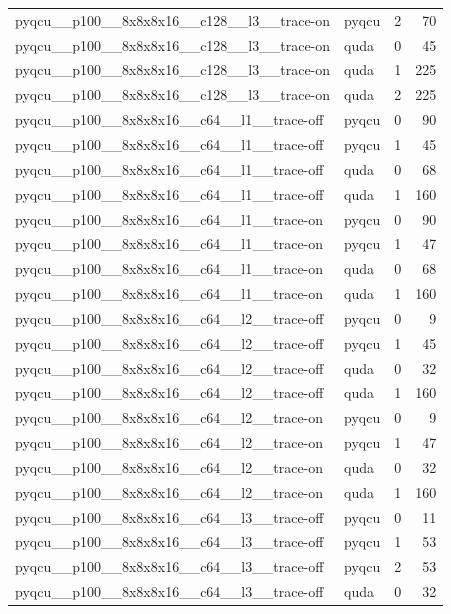 \begin{table}[htbp]
\begin{tabular}{@{}llrr@{}}
pyqcu\_\_p100\_\_8x8x8x16\_\_c128\_\_l3\_\_trace-on & pyqcu & 2 & 70 \\
pyqcu\_\_p100\_\_8x8x8x16\_\_c128\_\_l3\_\_trace-on & quda & 0 & 45 \\
pyqcu\_\_p100\_\_8x8x8x16\_\_c128\_\_l3\_\_trace-on & quda & 1 & 225 \\
pyqcu\_\_p100\_\_8x8x8x16\_\_c128\_\_l3\_\_trace-on & quda & 2 & 225 \\
pyqcu\_\_p100\_\_8x8x8x16\_\_c64\_\_l1\_\_trace-off & pyqcu & 0 & 90 \\
pyqcu\_\_p100\_\_8x8x8x16\_\_c64\_\_l1\_\_trace-off & pyqcu & 1 & 45 \\
pyqcu\_\_p100\_\_8x8x8x16\_\_c64\_\_l1\_\_trace-off & quda & 0 & 68 \\
pyqcu\_\_p100\_\_8x8x8x16\_\_c64\_\_l1\_\_trace-off & quda & 1 & 160 \\
pyqcu\_\_p100\_\_8x8x8x16\_\_c64\_\_l1\_\_trace-on & pyqcu & 0 & 90 \\
pyqcu\_\_p100\_\_8x8x8x16\_\_c64\_\_l1\_\_trace-on & pyqcu & 1 & 47 \\
pyqcu\_\_p100\_\_8x8x8x16\_\_c64\_\_l1\_\_trace-on & quda & 0 & 68 \\
pyqcu\_\_p100\_\_8x8x8x16\_\_c64\_\_l1\_\_trace-on & quda & 1 & 160 \\
pyqcu\_\_p100\_\_8x8x8x16\_\_c64\_\_l2\_\_trace-off & pyqcu & 0 & 9 \\
pyqcu\_\_p100\_\_8x8x8x16\_\_c64\_\_l2\_\_trace-off & pyqcu & 1 & 45 \\
pyqcu\_\_p100\_\_8x8x8x16\_\_c64\_\_l2\_\_trace-off & quda & 0 & 32 \\
pyqcu\_\_p100\_\_8x8x8x16\_\_c64\_\_l2\_\_trace-off & quda & 1 & 160 \\
pyqcu\_\_p100\_\_8x8x8x16\_\_c64\_\_l2\_\_trace-on & pyqcu & 0 & 9 \\
pyqcu\_\_p100\_\_8x8x8x16\_\_c64\_\_l2\_\_trace-on & pyqcu & 1 & 47 \\
pyqcu\_\_p100\_\_8x8x8x16\_\_c64\_\_l2\_\_trace-on & quda & 0 & 32 \\
pyqcu\_\_p100\_\_8x8x8x16\_\_c64\_\_l2\_\_trace-on & quda & 1 & 160 \\
pyqcu\_\_p100\_\_8x8x8x16\_\_c64\_\_l3\_\_trace-off & pyqcu & 0 & 11 \\
pyqcu\_\_p100\_\_8x8x8x16\_\_c64\_\_l3\_\_trace-off & pyqcu & 1 & 53 \\
pyqcu\_\_p100\_\_8x8x8x16\_\_c64\_\_l3\_\_trace-off & pyqcu & 2 & 53 \\
pyqcu\_\_p100\_\_8x8x8x16\_\_c64\_\_l3\_\_trace-off & quda & 0 & 32 \\

\end{tabular}
\end{table}
